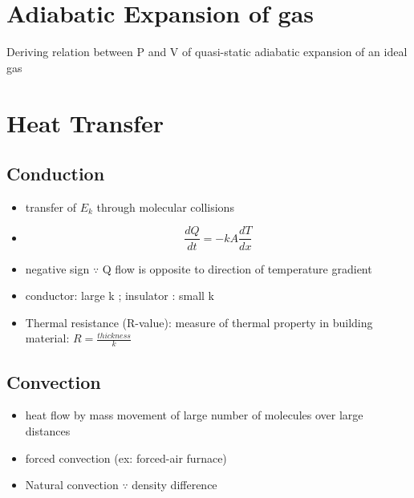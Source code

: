 \documentclass[12 pt , twoside, letterpaper] {article}
\begin{document}
	\section{Adiabatic Expansion of gas}
Deriving relation between P and V of quasi-static adiabatic expansion of an ideal  gas
	\vspace{15cm}
	
	\section{Heat Transfer}
		\subsection{Conduction}
			\begin{itemize}
			 \item transfer of $E_k$ through molecular collisions
			 \item \begin{equation}
			 \frac{dQ}{dt}= - kA\frac{dT}{dx}
			 \end{equation}
			 \item negative sign $\because$ Q flow is opposite to direction of temperature gradient
			 \item conductor: large k ; insulator : small k
			 \item Thermal resistance (R-value): measure of thermal property in building material:
			 $R=\frac{thickness}{k}$
			\end{itemize}

		\subsection{Convection}
			\begin{itemize}
				\item heat flow by mass movement of large number of molecules over large distances
				\item forced convection (ex: forced-air furnace)
				\item Natural convection $\because$ density difference
			\end{itemize}
\end{document}
